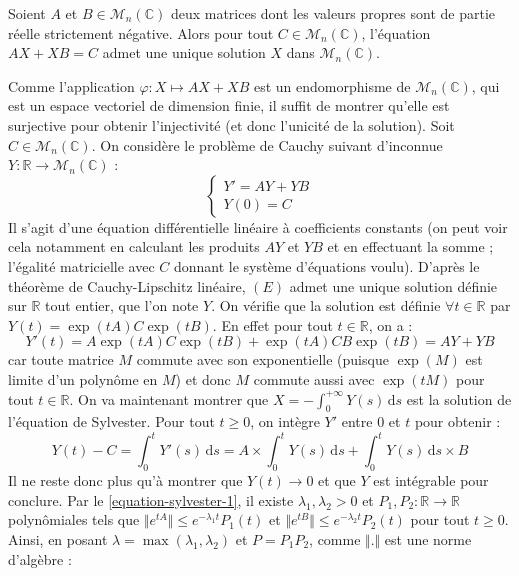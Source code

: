 	
	\begin{theorem}
		Soient $A$ et $B \in \mathcal{M}_n(\mathbb{C})$ deux matrices dont les valeurs propres sont de partie réelle strictement négative. Alors pour tout $C \in \mathcal{M}_n(\mathbb{C})$, l'équation $AX + XB = C$ admet une unique solution $X$ dans $\mathcal{M}_n(\mathbb{C})$.
	\end{theorem}
	
	\begin{demonstration}
		Comme l'application $\varphi : X \mapsto AX + XB$ est un endomorphisme de $\mathcal{M}_n(\mathbb{C})$, qui est un espace vectoriel de dimension finie, il suffit de montrer qu'elle est surjective pour obtenir l'injectivité (et donc l'unicité de la solution). Soit $C \in \mathcal{M}_n(\mathbb{C})$. On considère le problème de Cauchy suivant d'inconnue $Y : \mathbb{R} \rightarrow \mathcal{M}_n(\mathbb{C})$ :
		\[ \begin{cases} Y' = AY + YB \\ Y(0) = C \end{cases} \tag{$E$} \]
		Il s'agit d'une équation différentielle linéaire à coefficients constants (on peut voir cela notamment en calculant les produits $AY$ et $YB$ et en effectuant la somme ; l'égalité matricielle avec $C$ donnant le système d'équations voulu). D'après le théorème de Cauchy-Lipschitz linéaire, $(E)$ admet une unique solution définie sur $\mathbb{R}$ tout entier, que l'on note $Y$.
		\newpar
		On vérifie que la solution est définie $\forall t \in \mathbb{R}$ par $Y(t) = \exp(tA) C \exp(tB)$. En effet pour tout $t \in \mathbb{R}$, on a :
		\[ Y'(t) = A \exp(tA) C \exp(tB) + \exp(tA) CB \exp(tB) = AY + YB \]
		car toute matrice $M$ commute avec son exponentielle (puisque $\exp(M)$ est limite d'un polynôme en $M$) et donc $M$ commute aussi avec $\exp(tM)$ pour tout $t \in \mathbb{R}$.
		\newpar
		On va maintenant montrer que $X = - \int_{0}^{+\infty} Y(s) \, \mathrm{d}s$ est la solution de l'équation de Sylvester. Pour tout $t \geq 0$, on intègre $Y'$ entre $0$ et $t$ pour obtenir :
		\[ Y(t) - C = \int_0^t Y'(s) \, \mathrm{d}s = A \times \int_0^t Y(s) \, \mathrm{d}s + \int_0^t Y(s) \, \mathrm{d}s \times B \]
		\newpar
		Il ne reste donc plus qu'à montrer que $Y(t) \longrightarrow 0$ et que $Y$ est intégrable pour conclure. Par le \cref{equation-sylvester-1}, il existe $\lambda_1, \lambda_2 > 0$ et $P_1, P_2 : \mathbb{R} \rightarrow \mathbb{R}$ polynômiales tels que $\Vert e^{tA} \Vert \leq e^{- \lambda_1 t} P_1(t)$ et $\Vert e^{tB} \Vert \leq e^{-\lambda_2 t} P_2(t)$ pour tout $t \geq 0$. Ainsi, en posant $\lambda = \max(\lambda_1, \lambda_2)$ et $P = P_1 P_2$, comme $\Vert . \Vert$ est une norme d'algèbre :

\end{demonstration}
